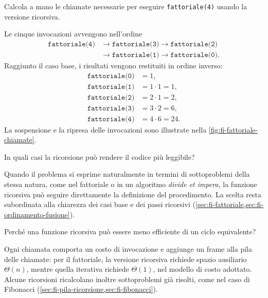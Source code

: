\begin{exercise}
\label{ex:fi-esercizi-ricorsione-traccia-quattro}
Calcola a mano le chiamate necessarie per eseguire
\texttt{fattoriale(4)} usando la versione ricorsiva.
\end{exercise}

Le cinque invocazioni avvengono nell'ordine
\[
\begin{aligned}
  \texttt{fattoriale(4)}&\to\texttt{fattoriale(3)}
  \to\texttt{fattoriale(2)}\\
  &\to\texttt{fattoriale(1)}\to\texttt{fattoriale(0)}.
\end{aligned}
\]
Raggiunto il caso base, i risultati vengono restituiti in ordine
inverso:
\[
\begin{aligned}
  \texttt{fattoriale(0)}&=1,\\
  \texttt{fattoriale(1)}&=1\cdot1=1,\\
  \texttt{fattoriale(2)}&=2\cdot1=2,\\
  \texttt{fattoriale(3)}&=3\cdot2=6,\\
  \texttt{fattoriale(4)}&=4\cdot6=24.
\end{aligned}
\]
La sospensione e la ripresa delle invocazioni sono illustrate
nella \cref{fig:fi-fattoriale-chiamate}.

\begin{exercise}
\label{ex:fi-esercizi-ricorsione-leggibilita}
In quali casi la ricorsione può rendere il codice più leggibile?
\end{exercise}

Quando il problema si esprime naturalmente in termini di
sottoproblemi della stessa natura, come nel fattoriale o in un
algoritmo \emph{divide et impera}, la funzione ricorsiva può
seguire direttamente la definizione del procedimento. La scelta
resta subordinata alla chiarezza dei casi base e dei passi
ricorsivi (\cref{sec:fi-fattoriale,sec:fi-ordinamento-fusione}).

\begin{exercise}
\label{ex:fi-esercizi-ricorsione-efficienza}
Perché una funzione ricorsiva può essere meno efficiente di un
ciclo equivalente?
\end{exercise}

Ogni chiamata comporta un costo di invocazione e aggiunge un
frame alla pila delle chiamate: per il fattoriale, la versione
ricorsiva richiede spazio ausiliario \(\Theta(n)\), mentre quella iterativa richiede
\(\Theta(1)\), nel modello di costo adottato. Alcune ricorsioni
ricalcolano inoltre sottoproblemi già risolti, come nel caso di
Fibonacci (\cref{sec:fi-pila-ricorsione,sec:fi-fibonacci}).

